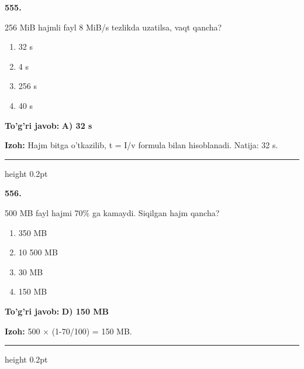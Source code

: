\documentclass[10pt,a4paper,oneside]{article}
\begin{document}
\noindent\textbf{\color{ink}555.}
\par
256 MiB hajmli fayl 8 MiB/s tezlikda uzatilsa, vaqt qancha?
\begin{enumerate}[label=\Alph*),leftmargin=9mm]
\item 32 s
\item 4 s
\item 256 s
\item 40 s
\end{enumerate}
\begin{tcolorbox}[enhanced,breakable,colback=teal!4,colframe=teal!50!black,boxrule=0.5pt,arc=1.1mm,left=3mm,right=3mm,top=1.7mm,bottom=1.7mm,before skip=2mm,after skip=2mm]
\textbf{\color{teal}To'g'ri javob:} \textbf{A) 32 s}
\par\smallskip
\textbf{Izoh:} Hajm bitga o'tkazilib, t = I/v formula bilan hisoblanadi. Natija: 32 s.
\end{tcolorbox}
\vspace{2mm}\hrule height 0.2pt \vspace{3mm}

\noindent\textbf{\color{ink}556.}
\par
500 MB fayl hajmi 70\% ga kamaydi. Siqilgan hajm qancha?
\begin{enumerate}[label=\Alph*),leftmargin=9mm]
\item 350 MB
\item 10 500 MB
\item 30 MB
\item 150 MB
\end{enumerate}
\begin{tcolorbox}[enhanced,breakable,colback=teal!4,colframe=teal!50!black,boxrule=0.5pt,arc=1.1mm,left=3mm,right=3mm,top=1.7mm,bottom=1.7mm,before skip=2mm,after skip=2mm]
\textbf{\color{teal}To'g'ri javob:} \textbf{D) 150 MB}
\par\smallskip
\textbf{Izoh:} 500 \ensuremath{\times} (1-70/100) = 150 MB.
\end{tcolorbox}
\vspace{2mm}\hrule height 0.2pt \vspace{3mm}
\end{document}
